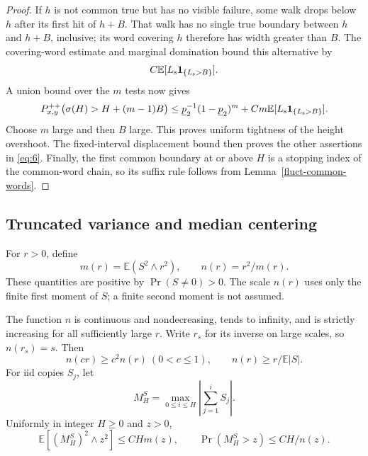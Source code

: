 \begin{proof}
If \(h\) is not common true but has no visible failure, some walk drops
below \(h\) after its first hit of \(h+B\). That walk has no single true
boundary between \(h\) and \(h+B\), inclusive; its word covering \(h\)
therefore has width greater than \(B\). The covering-word estimate and
marginal domination bound this alternative by
\[
C\mathbb E[L_{\rm s}\mathbf1_{\{L_{\rm s}>B\}}].
\]
A union bound over the \(m\) tests now gives
\[
P_{x,y}^{++}\bigl(\sigma(H)>H+(m-1)B\bigr)
 \le \underline p_2^{-1}(1-\underline p_2)^m
      +Cm\mathbb E[L_{\rm s}\mathbf1_{\{L_{\rm s}>B\}}].
\]
Choose \(m\) large and then \(B\) large. This proves uniform tightness of
the height overshoot. The fixed-interval displacement bound then proves
the other assertions in \eqref{eq:6}. Finally, the first common boundary
at or above \(H\) is a stopping index of the common-word chain, so its
suffix rule follows from Lemma~\ref{fluct-common-words}.
\end{proof}

\subsection{Truncated variance and median centering}

For \(r>0\), define
\[
m(r)=\mathbb E(S^2\wedge r^2),\qquad n(r)=r^2/m(r).
\]
These quantities are positive by \(\Pr(S\ne0)>0\). The scale \(n(r)\)
uses only the finite first moment of \(S\); a finite second moment is
not assumed.

\begin{lemma}\label{fluct-scales}
The function \(n\) is continuous and nondecreasing, tends to infinity,
and is strictly increasing for all sufficiently large \(r\). Write
\(r_s\) for its inverse on large scales, so \(n(r_s)=s\). Then
\[
n(cr)\ge c^2n(r)\ (0<c\le1),\qquad
n(r)\ge r/\mathbb E|S|.
\tag{7}\label{eq:7}
\]
For iid copies \(S_j\), let
\[
M_H^S=\max_{0\le i\le H}\left|\sum_{j=1}^iS_j\right|.
\]
Uniformly in integer \(H\ge0\) and \(z>0\),
\[
\mathbb E[(M_H^S)^2\wedge z^2]\le CHm(z),\qquad
\Pr(M_H^S>z)\le CH/n(z).
\tag{8}\label{eq:8}
\]
\end{lemma}

